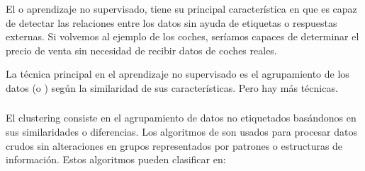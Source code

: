 El  o  aprendizaje no supervisado, tiene su principal característica en que es capaz de detectar las relaciones entre los datos sin ayuda de etiquetas o respuestas externas. Si volvemos al ejemplo de los coches, seríamos capaces de determinar el precio de venta sin necesidad de recibir datos de coches reales.

La técnica principal en el aprendizaje no supervisado es el agrupamiento de los datos (o ) según la similaridad de sus características. Pero hay más técnicas.

\subsubsection{}

El clustering consiste en el agrupamiento de datos no etiquetados basándonos en sus similaridades o diferencias. Los algoritmos de  son usados para procesar datos crudos sin alteraciones en grupos representados por patrones o estructuras de información. Estos algoritmos pueden clasificar en:

